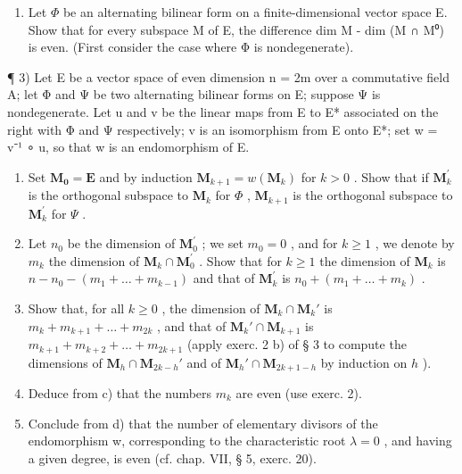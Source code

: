 \begin{enumerate}
\def\labelenumi{\arabic{enumi})}
\setcounter{enumi}{1}
\tightlist
\item
  Let \(\Phi\) be an alternating bilinear form on a finite-dimensional vector space E. Show that for every subspace M of E, the difference dim M - dim (M ∩ M⁰) is even. (First consider the case where Φ is nondegenerate).
\end{enumerate}

¶ 3) Let E be a vector space of even dimension n = 2m over a commutative field A; let Φ and Ψ be two alternating bilinear forms on E; suppose Ψ is nondegenerate. Let u and v be the linear maps from E to E* associated on the right with Φ and Ψ respectively; v is an isomorphism from E onto E*; set w = v⁻¹ ∘ u, so that w is an endomorphism of E.

\begin{enumerate}
\def\labelenumi{\alph{enumi})}
\item
  Set \(\mathbf{M}_{\mathbf{0}} = \mathbf{E}\) and by induction \(\mathbf{M}_{k+1} = w(\mathbf{M}_{k})\) for \(k > 0\) . Show that if \(\mathbf{M}_{k}^{\prime}\) is the orthogonal subspace to \(\mathbf{M}_{k}\) for \(\Phi\) , \(\mathbf{M}_{k+1}\) is the orthogonal subspace to \(\mathbf{M}_{k}^{\prime}\) for \(\Psi\) .
\item
  Let \(n_{0}\) be the dimension of \(\mathbf{M}_{0}^{\prime}\) ; we set \(m_{0}=0\) , and for \(k\geqslant1\) , we denote by \(m_{k}\) the dimension of \(\mathbf{M}_{k}\cap\mathbf{M}_{0}^{\prime}\) . Show that for \(k\geqslant1\) the dimension of \(\mathbf{M}_{k}\) is \(n-n_{0}-(m_{1}+\ldots+m_{k-1})\) and that of \(\mathbf{M}_{k}^{\prime}\) is \(n_{0}+(m_{1}+\ldots+m_{k})\) .
\item
  Show that, for all \(k \geqslant 0\) , the dimension of \(\mathbf{M}_k \cap \mathbf{M}_k'\) is \(m_k + m_{k+1} + \ldots + m_{2k}\) , and that of \(\mathbf{M}_k' \cap \mathbf{M}_{k+1}\) is \(m_{k+1} + m_{k+2} + \ldots + m_{2k+1}\) (apply exerc. 2 b) of § 3 to compute the dimensions of \(\mathbf{M}_h \cap \mathbf{M}_{2k-h}'\) and of \(\mathbf{M}_h' \cap \mathbf{M}_{2k+1-h}\) by induction on \(h\) ).
\item
  Deduce from c) that the numbers \(m_{k}\) are even (use exerc. 2).
\item
  Conclude from d) that the number of elementary divisors of the endomorphism w, corresponding to the characteristic root \(\lambda = 0\) , and having a given degree, is even (cf. chap. VII, § 5, exerc. 20).
\end{enumerate}

